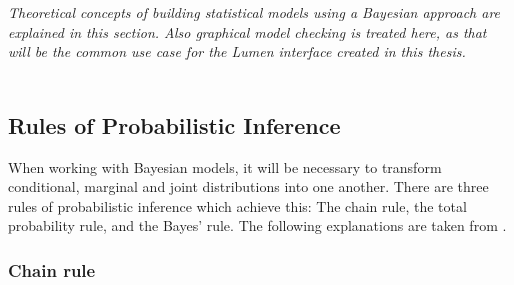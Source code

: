 \documentclass{article}
\begin{document}
\textit{Theoretical concepts of building statistical models using a Bayesian approach are explained in this section. Also graphical model checking is treated here, as that will be the common use case for the Lumen interface created in this thesis.}
\\
\\
%
\subsection{Rules of Probabilistic Inference}

When working with Bayesian models, it will be necessary to transform conditional, marginal and joint distributions into one another. There are three rules of probabilistic inference which achieve this: The chain rule, the total probability rule, and the Bayes' rule. The following explanations are taken from \cite{9781617292330}.

\subsubsection{Chain rule}
\end{document}
